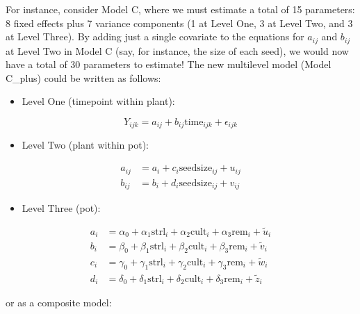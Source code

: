 \documentclass[
]{krantz}
\providecommand{\tightlist}{%
  \setlength{\itemsep}{0pt}\setlength{\parskip}{0pt}}
\begin{document}
For instance, consider Model C, where we must estimate a total of 15 parameters: 8 fixed effects plus 7 variance components (1 at Level One, 3 at Level Two, and 3 at Level Three). By adding just a single covariate to the equations for \(a_{ij}\) and \(b_{ij}\) at Level Two in Model C (say, for instance, the size of each seed), we would now have a total of 30 parameters to estimate! The new multilevel model (Model C\_plus) could be written as follows:

\begin{itemize}
\tightlist
\item
  Level One (timepoint within plant):
\end{itemize}

\begin{equation*}
Y_{ijk} = a_{ij}+b_{ij}\textrm{time}_{ijk}+\epsilon_{ijk}
\end{equation*}

\begin{itemize}
\tightlist
\item
  Level Two (plant within pot):
\end{itemize}

\begin{align*}
a_{ij} & = a_{i}+c_{i}\textrm{seedsize}_{ij}+u_{ij} \\
b_{ij} & = b_{i}+d_{i}\textrm{seedsize}_{ij}+v_{ij}
\end{align*}

\begin{itemize}
\tightlist
\item
  Level Three (pot):
\end{itemize}

\begin{align*}
a_{i} & = \alpha_{0}+\alpha_{1}\textrm{strl}_{i}+\alpha_{2}\textrm{cult}_{i}+\alpha_{3}\textrm{rem}_{i}+ \tilde{u}_{i}\\
b_{i} & = \beta_{0}+\beta_{1}\textrm{strl}_{i}+\beta_{2}\textrm{cult}_{i}+\beta_{3}\textrm{rem}_{i}+ \tilde{v}_{i} \\
c_{i} & = \gamma_{0}+\gamma_{1}\textrm{strl}_{i}+\gamma_{2}\textrm{cult}_{i}+\gamma_{3}\textrm{rem}_{i}+ \tilde{w}_{i} \\
d_{i} & = \delta_{0}+\delta_{1}\textrm{strl}_{i}+\delta_{2}\textrm{cult}_{i}+\delta_{3}\textrm{rem}_{i}+ \tilde{z}_{i}
\end{align*}

or as a composite model:
\end{document}
